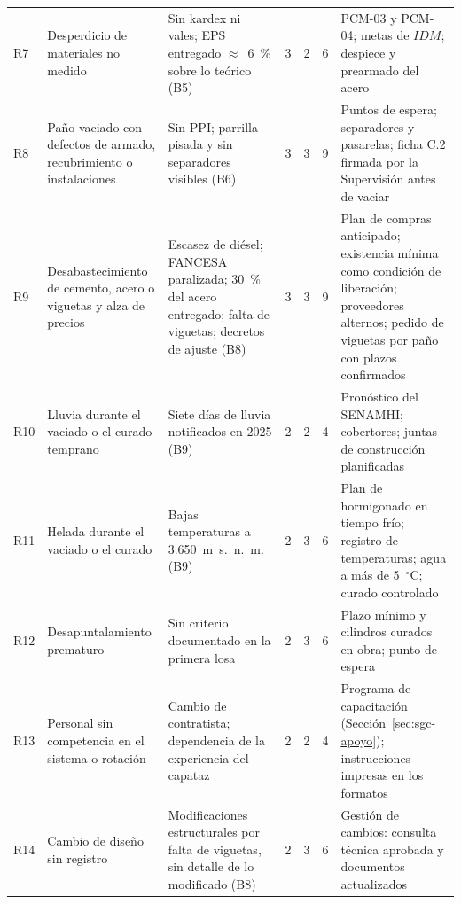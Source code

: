 \begin{longtable}{@{}P{0.75cm}P{3.25cm}P{3.85cm}Q{0.45cm}Q{0.45cm}Q{0.6cm}P{5.75cm}@{}}
R7 & Desperdicio de materiales no medido & Sin kardex ni vales; EPS entregado $\approx$~6~\% sobre lo teórico (B5) & 3 & 2 & 6 & PCM-03 y PCM-04; metas de $IDM$; despiece y prearmado del acero \\
R8 & Paño vaciado con defectos de armado, recubrimiento o instalaciones & Sin PPI; parrilla pisada y sin separadores visibles (B6) & 3 & 3 & 9 & Puntos de espera; separadores y pasarelas; ficha C.2 firmada por la Supervisión antes de vaciar \\
R9 & Desabastecimiento de cemento, acero o viguetas y alza de precios & Escasez de diésel; FANCESA paralizada; 30~\% del acero entregado; falta de viguetas; decretos de ajuste (B8) & 3 & 3 & 9 & Plan de compras anticipado; existencia mínima como condición de liberación; proveedores alternos; pedido de viguetas por paño con plazos confirmados \\
R10 & Lluvia durante el vaciado o el curado temprano & Siete días de lluvia notificados en 2025 (B9) & 2 & 2 & 4 & Pronóstico del SENAMHI; cobertores; juntas de construcción planificadas \\
R11 & Helada durante el vaciado o el curado & Bajas temperaturas a 3.650~m~s.~n.~m. (B9) & 2 & 3 & 6 & Plan de hormigonado en tiempo frío; registro de temperaturas; agua a más de 5~$^{\circ}$C; curado controlado \\
R12 & Desapuntalamiento prematuro & Sin criterio documentado en la primera losa & 2 & 3 & 6 & Plazo mínimo y cilindros curados en obra; punto de espera \\
R13 & Personal sin competencia en el sistema o rotación & Cambio de contratista; dependencia de la experiencia del capataz & 2 & 2 & 4 & Programa de capacitación (Sección~\ref{sec:sgc-apoyo}); instrucciones impresas en los formatos \\
R14 & Cambio de diseño sin registro & Modificaciones estructurales por falta de viguetas, sin detalle de lo modificado (B8) & 2 & 3 & 6 & Gestión de cambios: consulta técnica aprobada y documentos actualizados \\
\end{longtable}
\vspace{-6pt}
\endgroup


